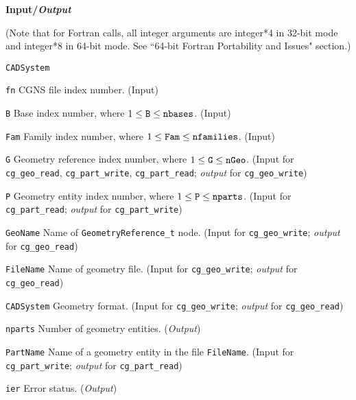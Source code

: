 \noindent
\textbf{\textcolor{input}{Input}/\textcolor{output}{\textit{Output}}}

\noindent (Note that for Fortran calls, all integer arguments are integer*4 in 32-bit mode and integer*8 in 64-bit mode.
See ``64-bit Fortran Portability and Issues" section.)

\begin{Ventryi}{\texttt{CADSystem}}\raggedright
\item [\texttt{fn}]
      CGNS file index number.
      (\textcolor{input}{Input})
\item [\texttt{B}]
      Base index number, where $1 \leq \text{\texttt{B}} \leq \text{\texttt{nbases}}$.
      (\textcolor{input}{Input})
\item [\texttt{Fam}]
      Family index number, where $1 \leq \text{\texttt{Fam}} \leq \text{\texttt{nfamilies}}$.
      (\textcolor{input}{Input})
\item [\texttt{G}]
      Geometry reference index number, where $1 \leq \text{\texttt{G}} \leq \text{\texttt{nGeo}}$.
      (\textcolor{input}{Input} for \texttt{cg\_geo\_read},
      \texttt{cg\_part\_write}, \texttt{cg\_part\_read};
      \textcolor{output}{\textit{output}} for \texttt{cg\_geo\_write})
\item [\texttt{P}]
      Geometry entity index number, where $1 \leq \text{\texttt{P}} \leq \text{\texttt{nparts}}$.
      (\textcolor{input}{Input} for \texttt{cg\_part\_read};
      \textcolor{output}{\textit{output}} for \texttt{cg\_part\_write})
\item [\texttt{GeoName}]
      Name of \texttt{GeometryReference\_t} node.
      (\textcolor{input}{Input} for \texttt{cg\_geo\_write};
      \textcolor{output}{\textit{output}} for \texttt{cg\_geo\_read})
\item [\texttt{FileName}]
      Name of geometry file.
      (\textcolor{input}{Input} for \texttt{cg\_geo\_write};
      \textcolor{output}{\textit{output}} for \texttt{cg\_geo\_read})
\item [\texttt{CADSystem}]
      Geometry format.
      (\textcolor{input}{Input} for \texttt{cg\_geo\_write};
      \textcolor{output}{\textit{output}} for \texttt{cg\_geo\_read})
\item [\texttt{nparts}]
      Number of geometry entities.
      (\textcolor{output}{\textit{Output}})
\item [\texttt{PartName}]
      Name of a geometry entity in the file \texttt{FileName}.
      (\textcolor{input}{Input} for \texttt{cg\_part\_write};
      \textcolor{output}{\textit{output}} for \texttt{cg\_part\_read})
\item [\texttt{ier}]
      Error status.
      (\textcolor{output}{\textit{Output}})
\end{Ventryi}

